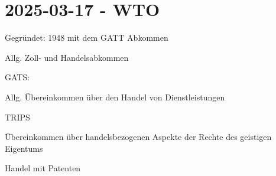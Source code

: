 \section{2025-03-17 - WTO}

\startitemize[packed]
\item Gegründet: 1948 mit dem GATT Abkommen
\startitemize[packed]
\item Allg. Zoll- und Handelsabkommen
\stopitemize
\item GATS:
\startitemize[packed]
\item Allg. Übereinkommen über den Handel von Dienstleistungen
\stopitemize
\item TRIPS
\startitemize[packed]
\item Übereinkommen über handelsbezogenen Aspekte der Rechte des geistigen Eigentums
\item Handel mit Patenten
\stopitemize
\stopitemize

